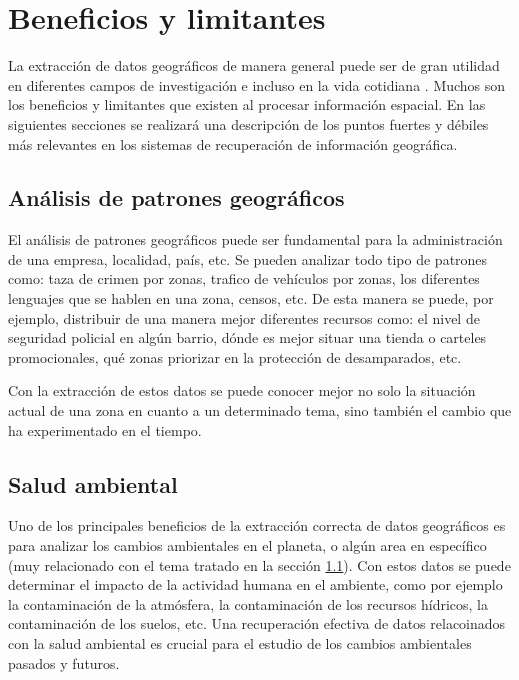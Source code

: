 \section{Beneficios y limitantes}\label{sec:pros-and-cons}

La extracción de datos geográficos de manera general puede ser de gran utilidad
en diferentes campos de investigación e incluso en la vida cotidiana
\cite{artz2009}. Muchos son los beneficios y limitantes que existen al procesar
información espacial. En las siguientes secciones se realizará una descripción
de los puntos fuertes y débiles más relevantes en los sistemas de recuperación
de información geográfica.

\subsection{Análisis de patrones geográficos}\label{sec:patr}

El análisis de patrones geográficos puede ser fundamental para la administración
de una empresa, localidad, país, etc. Se pueden analizar todo tipo de patrones
como: taza de crimen por zonas, trafico de vehículos por zonas, los diferentes
lenguajes que se hablen en una zona, censos, etc. De esta manera se puede, por ejemplo,
distribuir de una manera mejor diferentes recursos como: el nivel de seguridad
policial en algún barrio, dónde es mejor situar una tienda o carteles promocionales,
qué zonas priorizar en la protección de desamparados, etc.

Con la extracción de estos datos se puede conocer mejor no solo la situación
actual de una zona en cuanto a un determinado tema, sino también el cambio que
ha experimentado en el tiempo.

\subsection{Salud ambiental}\label{sec:pros}

Uno de los principales beneficios de la extracción correcta de datos
geográficos es para analizar los cambios ambientales \cite{scholten1991} en el
planeta, o algún area en específico (muy relacionado con el tema tratado en la
sección \ref{sec:patr}). Con estos datos se puede determinar el impacto de la
actividad humana en el ambiente, como por ejemplo la contaminación de la
atmósfera, la contaminación de los recursos hídricos, la contaminación de los
suelos, etc. Una recuperación efectiva de datos relacoinados con la salud
ambiental es crucial para el estudio de los cambios ambientales pasados y
futuros.

